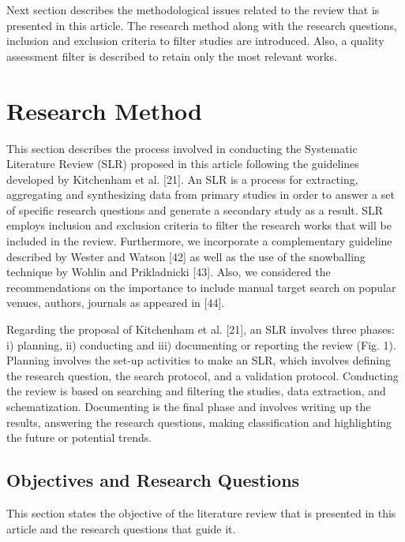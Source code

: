 \documentclass[peerreview]{IEEEtran}
\begin{document}
Next section describes the methodological issues related to the review that is presented in this article. The research method along with the research questions, inclusion and exclusion criteria to filter studies are introduced. Also, a quality assessment filter is described to retain only the most relevant works.


\section{Research Method}

This section describes the process involved in conducting the Systematic Literature Review (SLR)  proposed in this article following the guidelines developed by Kitchenham et al. [21]. An SLR is a process for extracting, aggregating and synthesizing data from primary studies in order to answer a set of specific research questions and generate a secondary study as a result. SLR employs inclusion and exclusion criteria to filter the research works that will be included in the review. Furthermore, we incorporate a complementary guideline described by Wester and Watson [42] as well as the use of the snowballing technique by Wohlin and Prikladnicki [43]. Also, we considered the recommendations on the importance to include manual target search on popular venues, authors, journals as appeared in [44].


Regarding the proposal of Kitchenham et al. [21], an SLR involves three phases: i) planning, ii) conducting and iii) documenting or reporting the review (Fig. 1). Planning involves the set-up activities to make an SLR, which involves defining the research question, the search protocol, and a validation protocol. Conducting the review is based on searching and filtering the studies, data extraction, and schematization. Documenting is the final phase and involves writing up the results, answering the research questions, making classification and highlighting the future or potential trends.



\subsection{Objectives and Research Questions}

This section states the objective of the literature review that is presented in this article and the research questions that guide it. 
\end{document}
